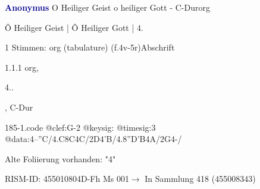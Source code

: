 \documentclass[twocolumn]{book}
\begin{document}
\par \vspace{7pt} \textcolor{darkblue}{\textbf{Anonymus  }}\hfillplus{\textbf{[185]}}\newline O Heiliger Geist o heiliger Gott - C-Dur\newline org
\par \begin{itshape}[f.4v, at left:] Ô Heiliger Geist | Ô Heiliger Gott | 4.\end{itshape} 
\par \textcolor{darkblue}{}  1 Stimmen: org (tabulature)  (f.4v-5r)\newline Abschrift
\par 1.1.1  org, \begin{itshape}4..\end{itshape}, C-Dur  
\begin{filecontents*}{185-1.code}
@clef:G-2
@keysig:
@timesig:3
@data:4--''C/4.C8C4C/2D4'B/4.8''D'B4A/2G4-/
\end{filecontents*}
\newline
%
\par Alte Foliierung vorhanden: "4"
\par RISM-ID: 455010804\newline D-Fh  Ms 001\newline $\rightarrow$ In Sammlung 418 (455008343)
      
\end{document}
